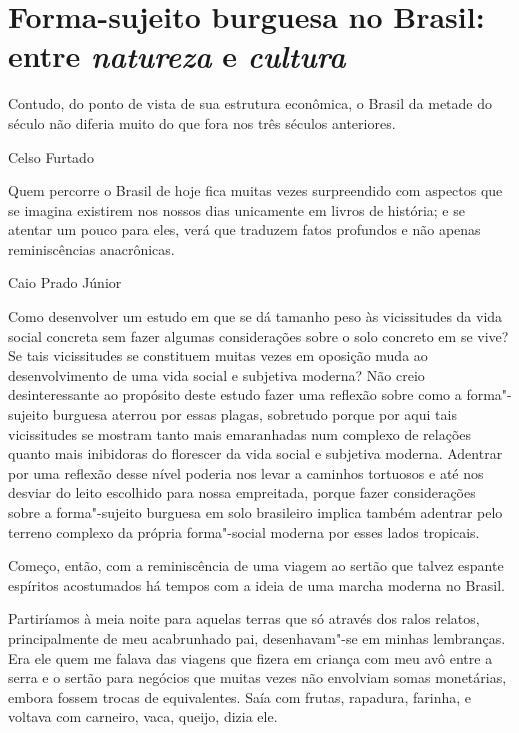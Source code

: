 \chapter*{Forma-sujeito burguesa no Brasil: entre \emph{natureza} e \emph{cultura}}


\epigraph{Contudo, do ponto de vista de sua estrutura econômica, o Brasil da
metade do século  não diferia muito do que fora nos três séculos
anteriores.}{Celso Furtado}

\medskip

\epigraph{Quem percorre o Brasil de hoje fica muitas vezes surpreendido com
aspectos que se imagina existirem nos nossos dias unicamente em livros
de história; e se atentar um pouco para eles, verá que traduzem fatos
profundos e não apenas reminiscências anacrônicas.}{Caio Prado Júnior}

Como desenvolver um estudo em que se dá tamanho peso às vicissitudes da
vida social concreta sem fazer algumas considerações sobre o solo
concreto em se vive? Se tais vicissitudes se constituem muitas vezes em
oposição muda ao desenvolvimento de uma vida social e subjetiva moderna?
Não creio desinteressante ao propósito deste estudo fazer uma reflexão sobre como a
forma"-sujeito burguesa aterrou por essas plagas, sobretudo porque por
aqui tais vicissitudes se mostram tanto mais emaranhadas num complexo de
relações quanto mais inibidoras do florescer da vida social e subjetiva
moderna. Adentrar por uma reflexão desse nível poderia nos levar a
caminhos tortuosos e até nos desviar do leito escolhido para nossa
empreitada, porque fazer considerações sobre a forma"-sujeito burguesa em
solo brasileiro implica também adentrar pelo terreno complexo da própria
forma"-social moderna por esses lados tropicais.

Começo, então, com a reminiscência de uma viagem ao sertão que talvez espante
espíritos acostumados há tempos com a ideia de uma marcha moderna no
Brasil.

Partiríamos à meia noite para aquelas terras que só através dos
ralos relatos, principalmente de meu acabrunhado pai, desenhavam"-se em
minhas lembranças. Era ele quem me falava das viagens que fizera em
criança com meu avô entre a serra e o sertão para negócios que muitas
vezes não envolviam somas monetárias, embora fossem trocas de
equivalentes. Saía com frutas, rapadura, farinha, e voltava com
carneiro, vaca, queijo, dizia ele.

